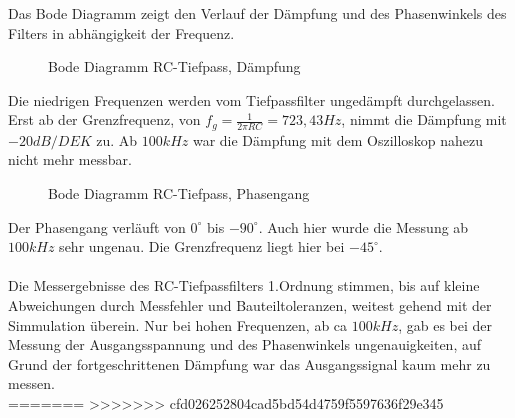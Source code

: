 Das Bode Diagramm zeigt den Verlauf der Dämpfung und des Phasenwinkels des Filters in abhängigkeit der Frequenz.\\
\begin{figure}[H]
  \centering
  \caption{Bode Diagramm RC-Tiefpass, Dämpfung}
\end{figure}
\noindent
Die niedrigen Frequenzen werden vom Tiefpassfilter ungedämpft durchgelassen. Erst ab der Grenzfrequenz, von $f_g = \frac{1}{2\pi RC} = 723,43Hz$, nimmt die Dämpfung
mit $-20dB/DEK$ zu. Ab $100kHz$ war die Dämpfung mit dem Oszilloskop nahezu nicht mehr messbar. \\

\begin{figure}[H]
  \centering
  \caption{Bode Diagramm RC-Tiefpass, Phasengang}
\end{figure}
\noindent
Der Phasengang verläuft von $0^\circ$ bis $-90^\circ$. Auch hier wurde die Messung ab $100kHz$ sehr ungenau. Die Grenzfrequenz liegt hier bei $-45^\circ$.\\
\\
Die Messergebnisse des RC-Tiefpassfilters 1.Ordnung stimmen, bis auf kleine Abweichungen durch Messfehler und Bauteiltoleranzen, weitest gehend mit der Simmulation überein. 
Nur bei hohen Frequenzen, ab ca $100kHz$, gab es bei der Messung der Ausgangsspannung und des Phasenwinkels ungenauigkeiten, auf Grund der fortgeschrittenen Dämpfung war das
Ausgangssignal kaum mehr zu messen. \\
=======
>>>>>>> cfd026252804cad5bd54d4759f5597636f29e345

